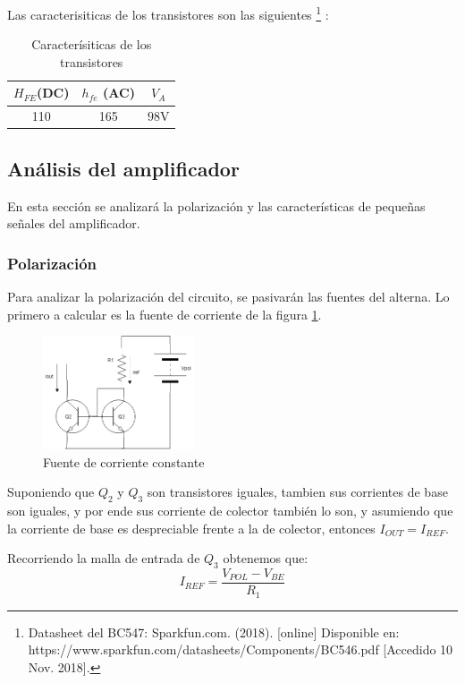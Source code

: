 \documentclass[../../main.tex]{subfiles}
\begin{document}
Las caracterisiticas de los transistores son las siguientes \footnote{Datasheet del BC547: Sparkfun.com. (2018). [online] Disponible en: https://www.sparkfun.com/datasheets/Components/BC546.pdf [Accedido 10 Nov. 2018].} :

\begin{table}[h]
\begin{center}
\begin{tabular}{|c|c|c|}
\hline
$H_{FE}$(DC)& $h_{fe}$ (AC)&$V_A$\\
\hline \hline
110&165 &$98\mathrm{V}$\\ \hline

\end{tabular}
\caption{Caracter\'isiticas de los transistores} \label{tab:qcar}
\end{center}
\end{table}

\subsection{Análisis del amplificador}
En esta sección se analizar\'a la polarización y las características de pequeñas señales del amplificador.
\subsubsection{Polarización}
Para analizar la polarización del circuito, se pasivar\'an las fuentes del alterna. Lo primero a calcular es la fuente de corriente de la figura \ref{fig:ms}.

\begin{figure}[H]	
	\centering
	\includegraphics[width=0.4\textwidth]{imagenes/mirrorsource.png}
	\caption{Fuente de corriente constante}\label{fig:ms}
\end{figure}
Suponiendo que $Q_2$ y $Q_3$ son transistores iguales, tambien sus corrientes de base son iguales, y por ende sus corriente de colector también lo son, y asumiendo que la corriente de base es despreciable frente a la de colector, entonces $I_{OUT}=I_{REF}$. 
\par Recorriendo la malla de entrada de $Q_3$ obtenemos que:
\begin{equation}
I_{REF}=\frac{V_{POL}-V_{BE}}{R_1}\label{eq:mss}
\end{equation}
\end{document}
